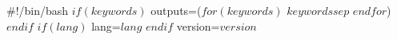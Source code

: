 #!/bin/bash
$if(keywords)$
outputs=($for(keywords)$
$keywords$$sep$ 
$endfor$)
$endif$
$if(lang)$
lang=$lang$
$endif$
version=$version$

